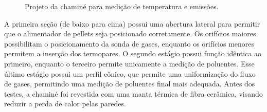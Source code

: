 \begin{figure}
	\centering
	\caption{Projeto da chaminé para medição de temperatura e emissões.}
	\label{fig:projeto_chamine}
\end{figure}

A primeira seção (de baixo para cima) possui uma abertura lateral para permitir que o alimentador de pellets seja posicionado corretamente. Os orifícios maiores possibilitam o posicionamento da sonda de gases, enquanto os orifícios menores permitem a inserção dos termopares. O segundo estágio possui função idêntica ao primeiro, enquanto o terceiro permite unicamente a medição de poluentes. Esse último estágio possui um perfil cônico, que permite uma uniformização do fluxo de gases, permitindo uma medição de poluentes final mais adequada. Antes dos testes, a chaminé foi revestida com uma manta térmica de fibra cerâmica, visando reduzir a perda de calor pelas paredes.

